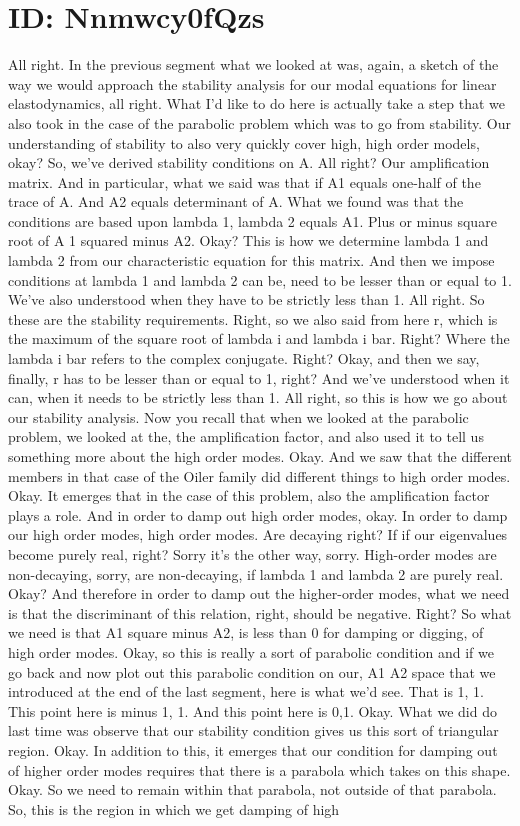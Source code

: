 \documentclass[10pt]{article}
\begin{document}
\section*{ID: Nnmwcy0fQzs}
All right. In the previous segment what we looked at was, again, a sketch of the way we would approach the stability analysis for our modal equations for linear elastodynamics, all right. What I'd like to do here is actually take a step that we also took in the case of the parabolic problem which was to go from stability. Our understanding of stability to also very quickly cover high, high order models, okay? So, we've derived stability conditions on A. All right? Our amplification matrix. And in particular, what we said was that if A1 equals one-half of the trace of A. And A2 equals determinant of A. What we found was that the conditions are based upon lambda 1, lambda 2 equals A1. Plus or minus square root of A 1 squared minus A2. Okay? This is how we determine lambda 1 and lambda 2 from our characteristic equation for this matrix. And then we impose conditions at lambda 1 and lambda 2 can be, need to be lesser than or equal to 1. We've also understood when they have to be strictly less than 1. All right. So these are the stability requirements. Right, so we also said from here r, which is  the maximum of the square root of lambda i and lambda i bar. Right? Where the lambda i bar refers to the complex conjugate. Right? Okay, and then we say, finally, r has to be lesser than or equal to 1, right? And we've understood when it can, when it needs to be strictly less than 1. All right, so this is how we go about our stability analysis. Now you recall that when we looked at the parabolic problem, we looked at the, the amplification factor, and also used it to tell us something more about the high order modes. Okay. And we saw that the different members in that case of the Oiler family did different things to high order modes. Okay. It emerges that in the case of this problem, also the amplification factor plays a role. And in order to damp out high order modes, okay. In order to damp our high order modes, high order modes. Are decaying right? If if our eigenvalues become purely real, right? Sorry  it's the other way, sorry. High-order modes are non-decaying, sorry, are non-decaying, if lambda 1 and lambda 2 are purely real. Okay? And therefore in order to damp out the higher-order modes, what we need is that the discriminant of this relation, right, should be negative. Right? So what we need is that A1 square minus A2, is less than 0 for damping or digging, of high order modes. Okay, so this is really a sort of parabolic condition and if we go back and now plot out this parabolic condition on our, A1 A2 space that we introduced at the end of the last segment, here is what we'd see. That is 1, 1. This point here is minus 1, 1. And this point here is 0,1. Okay. What we did do last time was observe that our stability condition gives us this sort of triangular region. Okay. In addition to this, it emerges that our condition for damping out of higher order modes requires that there is a parabola which takes on this shape. Okay. So we need to remain within that parabola, not outside of that parabola. So, this is the region in which we get damping of high 
\end{document}
